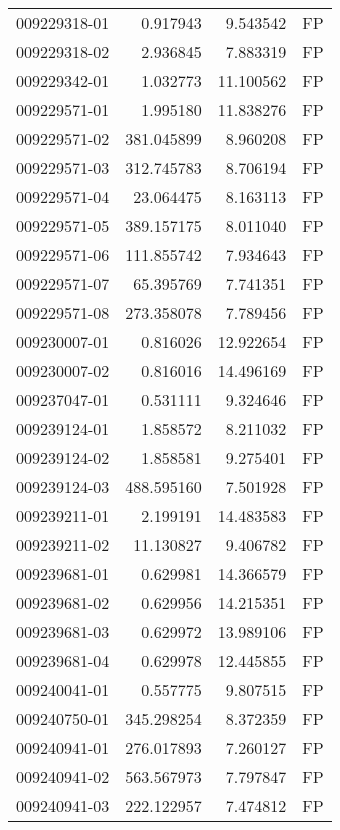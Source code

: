 \begin{tabular}{lrrl}
009229318-01 &    0.917943 &       9.543542 &   FP \\
009229318-02 &    2.936845 &       7.883319 &   FP \\
009229342-01 &    1.032773 &      11.100562 &   FP \\
009229571-01 &    1.995180 &      11.838276 &   FP \\
009229571-02 &  381.045899 &       8.960208 &   FP \\
009229571-03 &  312.745783 &       8.706194 &   FP \\
009229571-04 &   23.064475 &       8.163113 &   FP \\
009229571-05 &  389.157175 &       8.011040 &   FP \\
009229571-06 &  111.855742 &       7.934643 &   FP \\
009229571-07 &   65.395769 &       7.741351 &   FP \\
009229571-08 &  273.358078 &       7.789456 &   FP \\
009230007-01 &    0.816026 &      12.922654 &   FP \\
009230007-02 &    0.816016 &      14.496169 &   FP \\
009237047-01 &    0.531111 &       9.324646 &   FP \\
009239124-01 &    1.858572 &       8.211032 &   FP \\
009239124-02 &    1.858581 &       9.275401 &   FP \\
009239124-03 &  488.595160 &       7.501928 &   FP \\
009239211-01 &    2.199191 &      14.483583 &   FP \\
009239211-02 &   11.130827 &       9.406782 &   FP \\
009239681-01 &    0.629981 &      14.366579 &   FP \\
009239681-02 &    0.629956 &      14.215351 &   FP \\
009239681-03 &    0.629972 &      13.989106 &   FP \\
009239681-04 &    0.629978 &      12.445855 &   FP \\
009240041-01 &    0.557775 &       9.807515 &   FP \\
009240750-01 &  345.298254 &       8.372359 &   FP \\
009240941-01 &  276.017893 &       7.260127 &   FP \\
009240941-02 &  563.567973 &       7.797847 &   FP \\
009240941-03 &  222.122957 &       7.474812 &   FP \\

\end{tabular}
